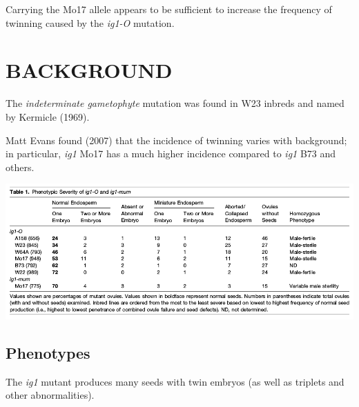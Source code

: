 \documentclass[maize,portrait]{a0poster}
\newlength{\figwidth}
\begin{document}
\begin{multicols}{3}
  Carrying the Mo17 allele appears to be sufficient to increase the frequency of twinning caused by the \textit{ig1-O} mutation.

  \section*{BACKGROUND}

  The \textit{indeterminate gametophyte} mutation was found in W23 inbreds and named by Kermicle (1969).

  Matt Evans found (2007) that the incidence of twinning varies with background; in particular, \textit{ig1} Mo17 has a much higher incidence compared to \textit{ig1} B73 and others.

  \begin{center}
    \includegraphics[width=\figwidth]{Evans-2007-Table-1.png}
  \end{center}

  \subsection*{Phenotypes}

  The \textit{ig1} mutant produces many seeds with twin embryos (as well as triplets and other abnormalities).


\end{multicols}
\end{document}
